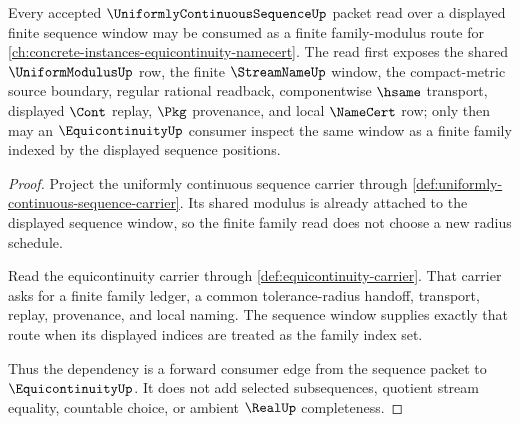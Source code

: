 \begin{theorem}
\label{thm:uniformly-continuous-sequence-cites-equicontinuity}
Every accepted $\UniformlyContinuousSequenceUp$ packet read over a displayed finite sequence window may be consumed as a finite family-modulus route for \autoref{ch:concrete-instances-equicontinuity-namecert}. The read first exposes the shared $\UniformModulusUp$ row, the finite $\StreamNameUp$ window, the compact-metric source boundary, regular rational readback, componentwise $\hsame$ transport, displayed $\Cont$ replay, $\Pkg$ provenance, and local $\NameCert$ row; only then may an $\EquicontinuityUp$ consumer inspect the same window as a finite family indexed by the displayed sequence positions.
\end{theorem}
\begin{proof}
Project the uniformly continuous sequence carrier through \autoref{def:uniformly-continuous-sequence-carrier}. Its shared modulus is already attached to the displayed sequence window, so the finite family read does not choose a new radius schedule.

Read the equicontinuity carrier through \autoref{def:equicontinuity-carrier}. That carrier asks for a finite family ledger, a common tolerance-radius handoff, transport, replay, provenance, and local naming. The sequence window supplies exactly that route when its displayed indices are treated as the family index set.

Thus the dependency is a forward consumer edge from the sequence packet to $\EquicontinuityUp$. It does not add selected subsequences, quotient stream equality, countable choice, or ambient $\RealUp$ completeness.
\end{proof}
